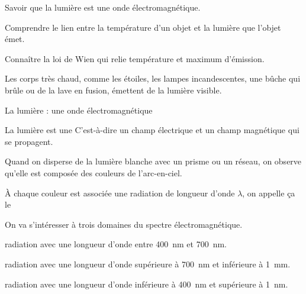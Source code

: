 \tetePremStssLumi
{}

\begin{objectifs}
  \item Savoir que la lumière est une onde électromagnétique.
  \item Comprendre le lien entre la température d'un objet et la lumière que l'objet émet.
  \item Connaître la loi de Wien qui relie température et maximum d'émission.
\end{objectifs}

\begin{contexte}
  Les corps très chaud, comme les étoiles, les lampes incandescentes, une bûche qui brûle ou de la lave en fusion, émettent de la lumière visible.
  
\end{contexte}


\begin{doc}{La lumière : une onde électromagnétique}
  \begin{importants}
    La lumière est une 
    C'est-à-dire un champ électrique et un champ magnétique qui se propagent.
  \end{importants}

  Quand on disperse de la lumière blanche avec un prisme ou un réseau, on observe qu'elle est composée des couleurs de l'arc-en-ciel.
  \begin{center}
  \end{center}
  \begin{center}
  \end{center}

  À chaque couleur est associée une radiation de longueur d'onde $\lambda$, on appelle ça le 

  \begin{importants}    
    On va s'intéresser à trois domaines du spectre électromagnétique.
    \begin{listePoints}
      \item {} radiation avec une longueur d'onde entre \qty{400}{\nm} et \qty{700}{\nm}.
      \item {} radiation avec une longueur d'onde supérieure à \qty{700}{\nm} et inférieure à \qty{1}{\mm}.
      \item {} radiation avec une longueur d'onde inférieure à \qty{400}{\nm} et supérieure à \qty{1}{\nm}.
    \end{listePoints}
  \end{importants}
\end{doc}

